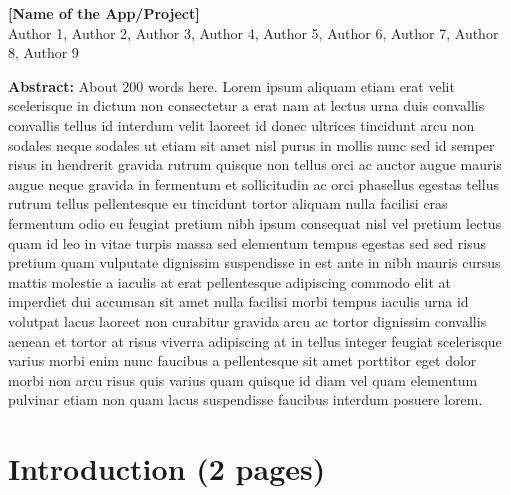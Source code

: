 \documentclass[12pt]{article}
\begin{document}
\begin{titlepage}
    \centering
    {\Huge \bfseries [Name of the App/Project]}\\[0.2cm]
    \vspace*{0.5cm}
    {\large Author 1, Author 2, Author 3, Author 4, Author 5, Author 6, Author 7, Author 8, Author 9}\\[2cm] %
    \vspace*{1cm}

    \begin{minipage}{0.9\textwidth}

        \textbf{Abstract:} About 200 words here. Lorem ipsum aliquam
        etiam erat velit scelerisque in dictum non consectetur a erat nam at lectus
        urna duis convallis convallis tellus id interdum velit laoreet id donec
        ultrices tincidunt arcu non sodales neque sodales ut etiam sit amet nisl
        purus in mollis nunc sed id semper risus in hendrerit gravida rutrum
        quisque non tellus orci ac auctor augue mauris augue neque gravida in
        fermentum et sollicitudin ac orci phasellus egestas tellus rutrum tellus
        pellentesque eu tincidunt tortor aliquam nulla facilisi cras fermentum odio
        eu feugiat pretium nibh ipsum consequat nisl vel pretium lectus quam id leo
        in vitae turpis massa sed elementum tempus egestas sed sed risus pretium
        quam vulputate dignissim suspendisse in est ante in nibh mauris cursus
        mattis molestie a iaculis at erat pellentesque adipiscing commodo elit at
        imperdiet dui accumsan sit amet nulla facilisi morbi tempus iaculis urna id
        volutpat lacus laoreet non curabitur gravida arcu ac tortor dignissim
        convallis aenean et tortor at risus viverra adipiscing at in tellus integer
        feugiat scelerisque varius morbi enim nunc faucibus a pellentesque sit amet
        porttitor eget dolor morbi non arcu risus quis varius quam quisque id diam
        vel quam elementum pulvinar etiam non quam lacus suspendisse faucibus
        interdum posuere lorem.

    \end{minipage}
\end{titlepage}
\thispagestyle{fancy}

\newpage

\tableofcontents
\thispagestyle{empty}

\newpage

\setcounter{page}{1}

\section{Introduction (2 pages)}
\end{document}
